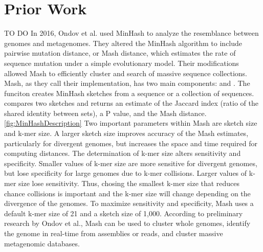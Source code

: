 \documentclass[12pt, letterpaper]{article}
\begin{document}
\section{Prior Work}
\begin{verbatim*}
[1 page] \color{red} TO DO \color{black} In 2016, Ondov et al. used MinHash to analyze the resemblance between genomes and metagenomes\cite{MinHash}. They altered the MinHash algorithm to include pairwise mutation distance, or Mash distance, which estimates the rate of sequence mutation under a simple evolutionary model. Their modifications allowed Mash to efficiently cluster and search of massive sequence collections. Mash, as they call their implementation, has two main components:  and . The  funciton creates MinHash sketches from a sequence or a collection of sequences.  compares two sketches and returns an estimate of the Jaccard index (ratio of the shared identity between sets), a P value, and the Mash distance.\ref{fig:MinHashDescription} Two important parameters within Mash are sketch size and k-mer size. A larger sketch size improves accuracy of the Mash estimates, particularly for divergent genomes, but increases the space and time required for computing distances. The determination of k-mer size alters sensitivity and specificity. Smaller values of k-mer size are more sensitive for divergent genomes, but lose specificity for large genomes due to k-mer collisions. Larger values of k-mer size lose sensitivity. Thus, chosing the smallest k-mer size that reduces chance collisions is important and the k-mer size will change depending on the divergence of the genomes. To maximize sensitivity and specificity, Mash uses a default k-mer size of 21 and a sketch size of 1,000. According to preliminary research by Ondov et al., Mash can be used to cluster whole genomes, identify the genome in real-time  from assemblies or reads, and cluster massive metagenomic databases.\\ \\
\end{verbatim*}
\end{document}
